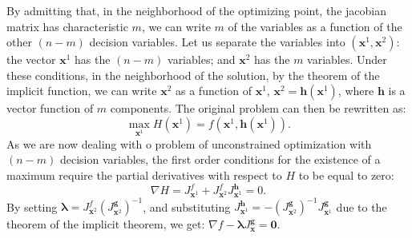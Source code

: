 \documentclass[0pt, a4paper]{article}
\begin{document}
By admitting that, in the neighborhood of the optimizing point, the jacobian matrix has characteristic $m$, we can write $m$ of the variables as a function of the other $(n-m)$ decision variables. Let us separate the variables into $(\textbf{x}^1, \textbf{x}^2)$: the vector $\textbf{x}^1$ has the $(n-m)$ variables; and  $\textbf{x}^2$ has the $m$ variables. Under these conditions, in the neighborhood of the solution, by the theorem of the implicit function, we can write $\textbf{x}^2$ as a function of $\textbf{x}^1$, $\textbf{x}^2=\textbf{h}(\textbf{x}^1)$, where $\textbf{h}$ is a vector function of $m$ components. The original problem can then be rewritten as:
$$\max_{\textbf{x}^1}H(\textbf{x}^1)=f(\textbf{x}^1,\textbf{h}(\textbf{x}^1)).$$
As we are now dealing with o problem of unconstrained optimization with $(n-m)$ decision variables, the first order conditions for the existence of a maximum require the partial derivatives with respect to $H$ to be equal to zero:
$$\nabla H=J^f_{\textbf{x}^1}+J^f_{\textbf{x}^2}J^\textbf{h}_{\textbf{x}^1}=0.$$
By setting $\boldsymbol{\lambda}=J^f_{\textbf{x}^2}\left(J^\textbf{g}_{\textbf{x}^2}\right)^{-1}$, and substituting $J^\textbf{h}_{\textbf{x}^1}=-\left(J^\textbf{g}_{\textbf{x}^2}\right)^{-1}J^\textbf{g}_{\textbf{x}^1}$ due to the theorem of the implicit theorem, we get:
$\nabla f-\boldsymbol{\lambda}J^\textbf{g}_\textbf{x}=\textbf{0}$.
\end{document}
